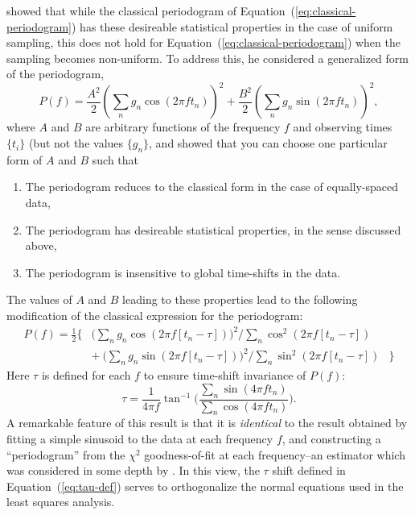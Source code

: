 \documentclass[preprint]{aastex}
\newcommand{\Eq}[1]{Equation~(\ref{eq:#1})}
\newcommand{\eq}[1]{\Eq{#1}}
\newcommand{\eqlabel}[1]{\label{eq:#1}}
\begin{document}
\citet{Scargle82} showed that while the classical periodogram of
\eq{classical-periodogram} has these desireable statistical properties
in the case of uniform sampling, this does not hold for
\eq{classical-periodogram} when the sampling becomes non-uniform.
To address this, he considered a generalized form of the periodogram,
\begin{equation}
  P(f) = \frac{A^2}{2}\left(\sum_n g_n \cos(2\pi f t_n)\right)^2
       + \frac{B^2}{2} \left(\sum_n g_n \sin(2\pi f t_n)\right)^2,
\end{equation}
where $A$ and $B$ are arbitrary functions of the frequency $f$ and
observing times $\{t_i\}$ (but not the values $\{g_n\}$, and showed
that you can choose one particular form of $A$ and $B$ such that
\begin{enumerate}
  \item The periodogram reduces to the classical form in the case of equally-spaced data,
  \item The periodogram has desireable statistical properties, in the sense discussed above,
  \item The periodogram is insensitive to global time-shifts in the data.
\end{enumerate}
The values of $A$ and $B$ leading to these properties lead to the following
modification of the classical expression for the periodogram:
\begin{eqnarray}
  P(f) =
  \frac{1}{2} \Bigg\{ &
  \bigg(\sum_n g_n \cos(2\pi f [t_n-\tau])\bigg)^2 \bigg/
  \sum_n \cos^2(2\pi f [t_n-\tau]) &\nonumber\\
  & + ~ \bigg(\sum_n g_n \sin(2\pi f [t_n-\tau])\bigg)^2 \bigg/
  \sum_n \sin^2(2\pi f [t_n-\tau]) & \Bigg\}
  \eqlabel{lomb-scargle-periodogram}
\end{eqnarray}
Here $\tau$ is defined for each $f$ to ensure time-shift invariance of $P(f)$:
\begin{equation}
  \tau = \frac{1}{4\pi f}\tan^{-1}\Bigg(
  \frac{\sum_n \sin(4\pi f t_n)}{\sum_n \cos(4\pi f t_n)}\Bigg).
  \eqlabel{tau-def}
\end{equation}
A remarkable feature of this result is that it is {\it identical} to the result
obtained by fitting a simple sinusoid to the data at each frequency $f$, and
constructing a ``periodogram'' from the $\chi^2$ goodness-of-fit at each
frequency--an estimator which was considered in some depth by \citet{Lomb76}.
In this view, the $\tau$ shift defined in \eq{tau-def} serves to orthogonalize
the normal equations used in the least squares analysis.
\end{document}
